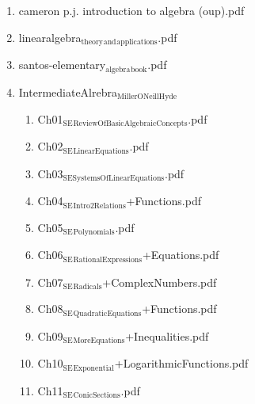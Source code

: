 \documentclass[11pt]{article}
\begin{document}
\begin{enumerate}
\begin{enumerate}
\item cameron p.j. introduction to algebra (oup).pdf
\label{sec-1-1-1-1-29-22-16}

\item linearalgebra$_{\text{theory}}$$_{\text{and}}$$_{\text{applications}}$.pdf
\label{sec-1-1-1-1-29-22-17}

\item santos-elementary$_{\text{algebra}}$$_{\text{book}}$.pdf
\label{sec-1-1-1-1-29-22-18}

\item IntermediateAlrebra$_{\text{MillerONeillHyde}}$
\label{sec-1-1-1-1-29-22-19}
\begin{enumerate}
\item Ch01$_{\text{SE}}$$_{\text{ReviewOfBasicAlgebraicConcepts}}$.pdf
\label{sec-1-1-1-1-29-22-19-1}

\item Ch02$_{\text{SE}}$$_{\text{LinearEquations}}$.pdf
\label{sec-1-1-1-1-29-22-19-2}

\item Ch03$_{\text{SESystemsOfLinearEquations}}$.pdf
\label{sec-1-1-1-1-29-22-19-3}

\item Ch04$_{\text{SE}}$$_{\text{Intro2Relations}}$+Functions.pdf
\label{sec-1-1-1-1-29-22-19-4}

\item Ch05$_{\text{SE}}$$_{\text{Polynomials}}$.pdf
\label{sec-1-1-1-1-29-22-19-5}

\item Ch06$_{\text{SE}}$$_{\text{RationalExpressions}}$+Equations.pdf
\label{sec-1-1-1-1-29-22-19-6}

\item Ch07$_{\text{SE}}$$_{\text{Radicals}}$+ComplexNumbers.pdf
\label{sec-1-1-1-1-29-22-19-7}

\item Ch08$_{\text{SE}}$$_{\text{QuadraticEquations}}$+Functions.pdf
\label{sec-1-1-1-1-29-22-19-8}

\item Ch09$_{\text{SE}}$$_{\text{MoreEquations}}$+Inequalities.pdf
\label{sec-1-1-1-1-29-22-19-9}

\item Ch10$_{\text{SE}}$$_{\text{Exponential}}$+LogarithmicFunctions.pdf
\label{sec-1-1-1-1-29-22-19-10}

\item Ch11$_{\text{SE}}$$_{\text{ConicSections}}$.pdf
\label{sec-1-1-1-1-29-22-19-11}
\end{enumerate}


\end{enumerate}
\end{enumerate}
\end{document}
